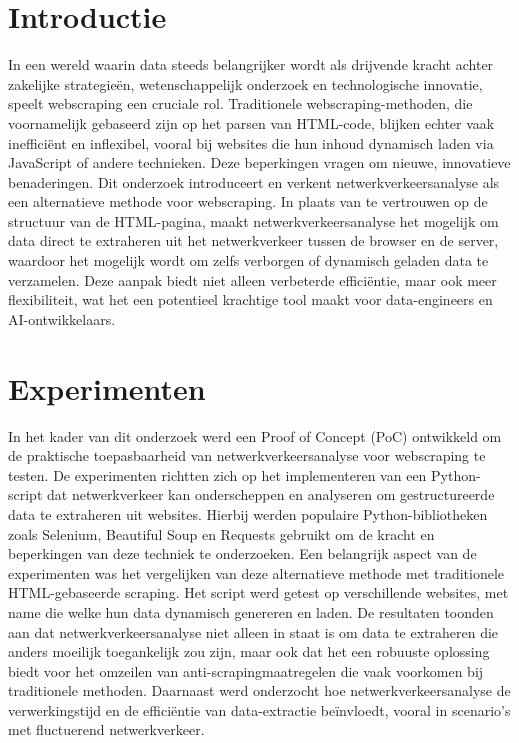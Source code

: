 \documentclass[a0,portrait]{hogent-poster}
\begin{document}
\begin{multicols}{2} %

\section{Introductie}

In een wereld waarin data steeds belangrijker wordt als drijvende kracht achter zakelijke strategieën, wetenschappelijk onderzoek en technologische innovatie, speelt webscraping een cruciale rol. Traditionele webscraping-methoden, die voornamelijk gebaseerd zijn op het parsen van HTML-code, blijken echter vaak inefficiënt en inflexibel, vooral bij websites die hun inhoud dynamisch laden via JavaScript of andere technieken. Deze beperkingen vragen om nieuwe, innovatieve benaderingen. Dit onderzoek introduceert en verkent netwerkverkeersanalyse als een alternatieve methode voor webscraping. In plaats van te vertrouwen op de structuur van de HTML-pagina, maakt netwerkverkeersanalyse het mogelijk om data direct te extraheren uit het netwerkverkeer tussen de browser en de server, waardoor het mogelijk wordt om zelfs verborgen of dynamisch geladen data te verzamelen. Deze aanpak biedt niet alleen verbeterde efficiëntie, maar ook meer flexibiliteit, wat het een potentieel krachtige tool maakt voor data-engineers en AI-ontwikkelaars.

\section{Experimenten}

In het kader van dit onderzoek werd een Proof of Concept (PoC) ontwikkeld om de praktische toepasbaarheid van netwerkverkeersanalyse voor webscraping te testen. De experimenten richtten zich op het implementeren van een Python-script dat netwerkverkeer kan onderscheppen en analyseren om gestructureerde data te extraheren uit websites. Hierbij werden populaire Python-bibliotheken zoals Selenium, Beautiful Soup en Requests gebruikt om de kracht en beperkingen van deze techniek te onderzoeken. Een belangrijk aspect van de experimenten was het vergelijken van deze alternatieve methode met traditionele HTML-gebaseerde scraping. Het script werd getest op verschillende websites, met name die welke hun data dynamisch genereren en laden. De resultaten toonden aan dat netwerkverkeersanalyse niet alleen in staat is om data te extraheren die anders moeilijk toegankelijk zou zijn, maar ook dat het een robuuste oplossing biedt voor het omzeilen van anti-scrapingmaatregelen die vaak voorkomen bij traditionele methoden. Daarnaast werd onderzocht hoe netwerkverkeersanalyse de verwerkingstijd en de efficiëntie van data-extractie beïnvloedt, vooral in scenario's met fluctuerend netwerkverkeer.


\end{multicols}
\end{document}
